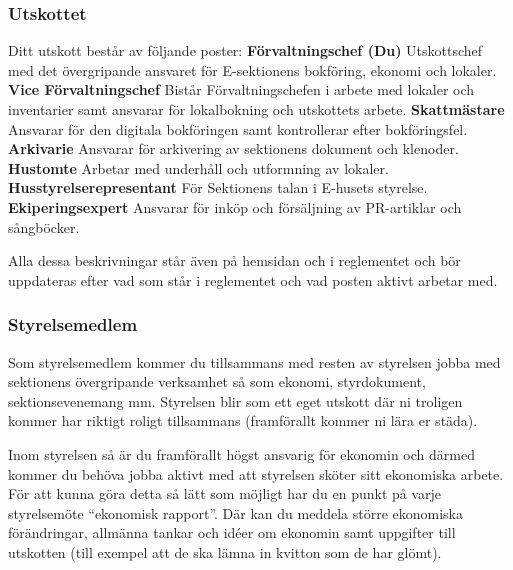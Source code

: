 \documentclass[10pt]{article}
\begin{document}
\subsubsection{Utskottet}
Ditt utskott består av följande poster: \newline \newline
\textbf{Förvaltningschef (Du)}
Utskottschef med det övergripande ansvaret för E-sektionens bokföring, ekonomi och lokaler. \newline \newline
\textbf{Vice Förvaltningschef} 
Bistår Förvaltningschefen i arbete med lokaler och inventarier samt ansvarar för lokalbokning och utskottets arbete.\newline \newline
\textbf{Skattmästare}
Ansvarar för den digitala bokföringen samt kontrollerar efter bokföringsfel.\newline \newline
\textbf{Arkivarie} 
Ansvarar för arkivering av sektionens dokument och klenoder.\newline \newline
\textbf{Hustomte}
Arbetar med underhåll och utformning av lokaler.\newline \newline
\textbf{Husstyrelserepresentant} 
För Sektionens talan i E-husets styrelse.\newline \newline
\textbf{Ekiperingsexpert} 
Ansvarar för inköp och försäljning av PR-artiklar och sångböcker.\newline

Alla dessa beskrivningar står även på hemsidan och i reglementet och bör uppdateras efter vad som står i reglementet och vad posten aktivt arbetar med.

\subsubsection{Styrelsemedlem}
Som styrelsemedlem kommer du tillsammans med resten av styrelsen jobba med sektionens övergripande verksamhet så som ekonomi, styrdokument, sektionsevenemang mm. Styrelsen blir som ett eget utskott där ni troligen kommer har riktigt roligt tillsammans (framförallt kommer ni lära er städa).

Inom styrelsen så är du framförallt högst ansvarig för ekonomin och därmed kommer du behöva jobba aktivt med att styrelsen sköter sitt ekonomiska arbete. För att kunna göra detta så lätt som möjligt har du en punkt på varje styrelsemöte “ekonomisk rapport”. Där kan du meddela större ekonomiska förändringar, allmänna tankar och idéer om ekonomin samt uppgifter till utskotten (till exempel att de ska lämna in kvitton som de har glömt).
\end{document}
